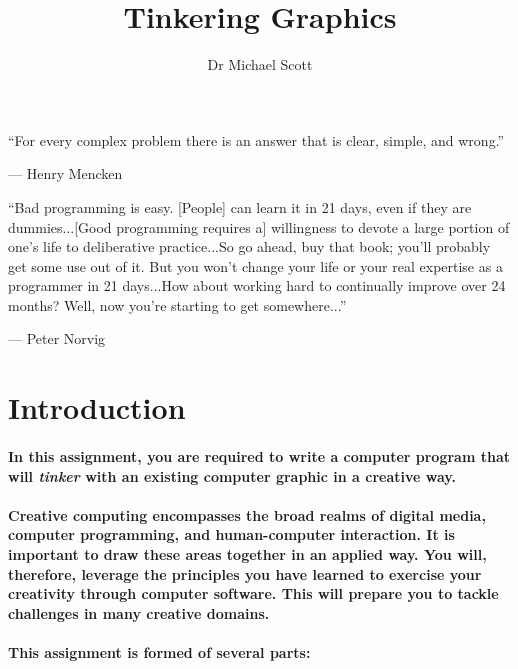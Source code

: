 \documentclass{../../fal_assignment}
\title{Tinkering Graphics}
\author{Dr Michael Scott}
\begin{document}
\maketitle

\begin{marginquote}
``For every complex problem there is an answer that is clear, simple, and wrong.''

--- Henry Mencken

\marginquoterule

``Bad programming is easy. [People] can learn it in 21 days, even if they are dummies...[Good programming requires a] willingness to devote a large portion of one's life to deliberative practice...So go ahead, buy that book; you'll probably get some use out of it. But you won't change your life or your real expertise as a programmer in 21 days...How about working hard to continually improve over 24 months? Well, now you're starting to get somewhere...''
\par --- Peter Norvig

\end{marginquote}

\section*{Introduction}

\paragraph{In this assignment, you are required to write a computer program that will \textit{tinker} with an existing computer graphic in a creative way.}

\paragraph{Creative computing encompasses the broad realms of digital media, computer programming, and human-computer interaction. It is important to draw these areas together in an applied way. You will, therefore, leverage the principles you have learned to exercise your creativity through computer software. This will prepare you to tackle challenges in many creative domains.}

\paragraph{This assignment is formed of several parts:}
\end{document}
